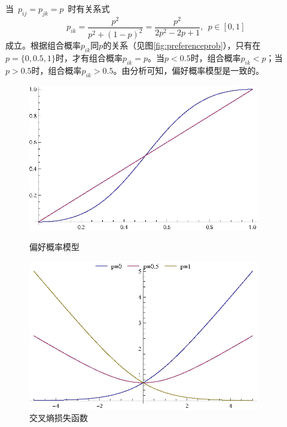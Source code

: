 当~$p_{ij}=p_{jk}=p$~时有关系式
\begin{equation}
    p_{ik} = \frac{p^2}{p^2 + (1-p)^2} = \frac{p^2}{2p^2 - 2p + 1},~~p\in [0,1]
\end{equation}
成立。根据组合概率$p_{ik}$同$p$的关系（见图\ref{fig:preferenceprob}），只有在$p=\{0,0.5,1\}$时，才有组合概率$p_{ik}=p$。当$p<0.5$时，组合概率$p_{ik}<p$；当$p>0.5$时，组合概率$p_{ik}>0.5$。由分析可知，偏好概率模型是一致的。



\begin{figure}[htbp]
  \begin{minipage}[t]{0.49\linewidth}
      \centering
      \includegraphics[width=0.9\textwidth]{figures/preferenceprob.eps}
      \caption{偏好概率模型}\label{fig:preferenceprob}
  \end{minipage}
  \begin{minipage}[t]{0.49\linewidth}
      \centering
      \includegraphics[width=0.9\textwidth]{figures/entropyloss.eps}
      \caption{交叉熵损失函数}\label{fig:entropyloss}
  \end{minipage}
\end{figure}

